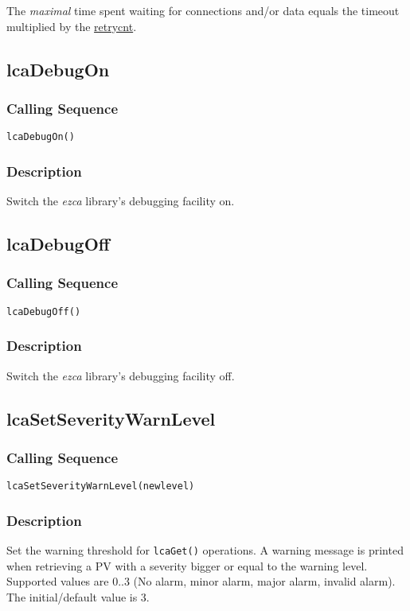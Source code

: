 \documentclass{article}
\newcommand{\ezca}{\ita{ezca}}
\newcommand{\com}[1]{{\tt #1}}
\newcommand{\pbrk}{\pagebreak[3]}
\newcommand{\ita}[1]{\emph{#1}}
\newcommand{\sevrange}{$0..3$}
\renewcommand{\sevrange}{0..3}
\renewcommand{\pbrk}{}
\begin{document}
The {\em maximal} time spent waiting for connections and/or data equals the
timeout multiplied by the
\hyperref{retry count}{retry count (see }{ )}{retrycnt}.

\vspace*{\fill}
\pbrk
\subsection{lcaDebugOn}
\subsubsection{Calling Sequence}
\begin{verbatim}
lcaDebugOn()
\end{verbatim}
\subsubsection{Description}
Switch the \ezca{} library's debugging facility on.

\vspace*{\fill}
\pbrk
\subsection{lcaDebugOff}
\subsubsection{Calling Sequence}
\begin{verbatim}
lcaDebugOff()
\end{verbatim}
\subsubsection{Description}
Switch the \ezca{} library's debugging facility off.

\vspace*{\fill}
\pbrk
\subsection{lcaSetSeverityWarnLevel}
\label{swarnlevel}
\subsubsection{Calling Sequence}
\begin{verbatim}
lcaSetSeverityWarnLevel(newlevel)
\end{verbatim}
\subsubsection{Description}
Set the warning threshold for \com{lcaGet()} operations.
A warning message is printed when retrieving a PV with a severity bigger
or equal to the warning level. Supported values are \sevrange{} (No alarm,
minor alarm, major alarm, invalid alarm). The initial/default value is 3.
\end{document}
